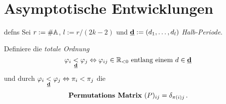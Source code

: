 \section{Asymptotische Entwicklungen}
\begin{frame}[t]{defns}
  Sei $r:=\#\A$, $l:=r/(2k-2)$ und $\textbf{\underline{d}}:=(d_1,\dots,d_l)$
  \emph{Halb-Periode}.
  \begin{defn}
    Definiere die \emph{totale Ordnung}
    \[
      \phi_i\underset{\textbf{\underline{d}}}{<}\phi_j
      \Leftrightarrow{}
      \phi_{ij}\in\R_{<0}\text{
      entlang einem } d\in\textbf{\underline{d}}
    \]
    und durch $\phi_i\underset{\textbf{\underline{d}}}{<}\phi_j
    \Leftrightarrow{}\pi_i<\pi_j$ die
    \[
      \text{\emph{Permutations Matrix} } (P)_{ij}=\delta_{\pi(i)j} \,.
    \]
  \end{defn}
\end{frame}

